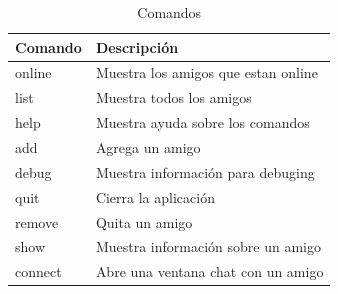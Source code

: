 \documentclass[a4paper, 12pt]{article}
\begin{document}
\begin{table}[h]
        \centering
        \begin{tabular}{|p{5cm}|p{8cm}|}
                \hline
                \textbf{Comando} & \textbf{Descripción} \\
                \hline
                online & Muestra los amigos que estan online \\
                \hline
                list & Muestra todos los amigos \\
                \hline
                help & Muestra ayuda sobre los comandos \\
                \hline
                add & Agrega un amigo \\
                \hline 
                debug & Muestra información para debuging \\
                \hline
                quit & Cierra la aplicación \\
                \hline
                remove & Quita un amigo \\
                \hline
                show & Muestra información sobre un amigo \\
                \hline
                connect & Abre una ventana chat con un amigo \\
                \hline
        \end{tabular}
        \caption{Comandos}
        \label{tab:comandos}
\end{table}
\end{document}
